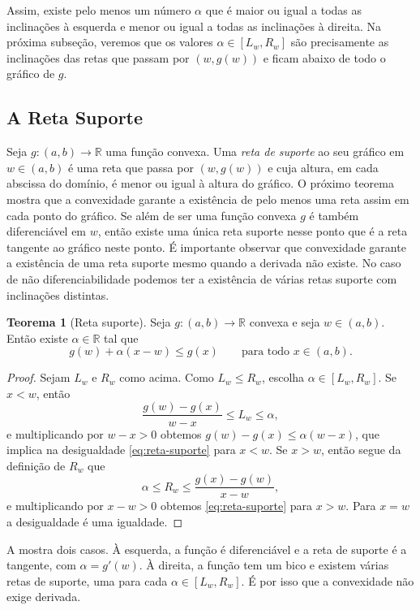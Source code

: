 \documentclass[12pt,portuguese]{article}
\theoremstyle{definition}
\newtheorem{theorem}{Teorema}
\theoremstyle{plainexercise}
\theoremstyle{starredexercise}
\theoremstyle{definition}
\begin{document}
Assim, existe pelo menos um número $\alpha$ que é maior ou igual a todas
as inclinações à esquerda e menor ou igual a todas as inclinações à
direita. Na próxima subseção, veremos que os valores
$\alpha\in[L_w,R_w]$ são precisamente as inclinações das retas que passam
por $(w,g(w))$ e ficam abaixo de todo o gráfico de $g$.

\subsection{A Reta Suporte}\label{subsec:reta-suporte}

Seja $g\colon(a,b)\to\mathbb{R}$ uma função convexa. Uma \emph{reta de
suporte} ao seu gráfico em $w\in(a,b)$ é uma reta que passa por
$(w,g(w))$ e cuja altura, em cada abscissa do domínio, é menor ou igual
à altura do gráfico. O próximo teorema mostra que a convexidade garante
a existência de pelo menos uma reta assim em cada ponto do gráfico.
Se além de ser uma função convexa $g$ é também diferenciável em $w$, então 
existe uma única reta suporte nesse ponto que é a reta tangente ao gráfico neste ponto. 
É importante observar que convexidade garante a 
existência de uma reta suporte mesmo quando a derivada não existe. No caso de não diferenciabilidade 
podemos ter a existência de várias retas suporte com inclinações distintas.

\begin{theorem}[Reta suporte]\label{thm:reta-suporte}
Seja $g\colon(a,b)\to\mathbb{R}$ convexa e seja $w\in(a,b)$. Então existe
$\alpha\in\mathbb{R}$ tal que
\begin{equation}\label{eq:reta-suporte}
g(w)+\alpha(x-w) \leqslant g(x)
\qquad
\text{para todo }x\in(a,b).
\end{equation}
\end{theorem}

\begin{proof}
Sejam $L_w$ e $R_w$ como acima. Como $L_w\leqslant R_w$, escolha
$\alpha\in[L_w,R_w]$. Se $x<w$, então
\[
\frac{g(w)-g(x)}{w-x}\leqslant L_w\leqslant\alpha,
\]
e multiplicando por $w-x>0$ obtemos $g(w)-g(x)\leqslant\alpha(w-x)$, que implica
na desigualdade \eqref{eq:reta-suporte} para $x<w$. Se $x>w$, então
segue da definição de $R_w$ que 
\[
\alpha\leqslant R_w\leqslant\frac{g(x)-g(w)}{x-w},
\]
e multiplicando por $x-w>0$ obtemos \eqref{eq:reta-suporte} para $x>w$. Para
$x=w$ a desigualdade é uma igualdade.
\end{proof}

A  mostra dois casos. À esquerda, a função é
diferenciável e a reta de suporte é a tangente, com $\alpha=g'(w)$. À direita,
a função tem um bico e existem várias retas de suporte, uma para cada
$\alpha\in[L_w,R_w]$. É por isso que a convexidade não exige derivada.
\end{document}
